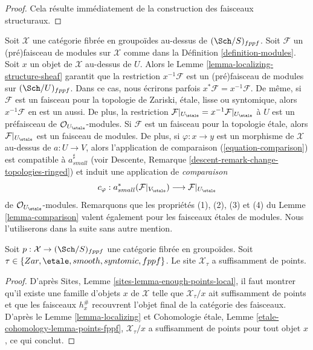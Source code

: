 \begin{proof}
Cela résulte immédiatement de la construction des faisceaux structuraux.
\end{proof}

\noindent
Soit $\mathcal{X}$ une catégorie fibrée en groupoïdes au-dessus de $(\Sch/S)_{fppf}$.
Soit $\mathcal{F}$ un (pré)faisceau de modules sur $\mathcal{X}$ comme dans la
Définition \ref{definition-modules}.
Soit $x$ un objet de $\mathcal{X}$ au-dessus de $U$. Alors le
Lemme \ref{lemma-localizing-structure-sheaf}
garantit que la restriction
$x^{-1}\mathcal{F}$ est un (pré)faisceau de modules sur $(\Sch/U)_{fppf}$.
Dans ce cas, nous écrirons parfois $x^*\mathcal{F} = x^{-1}\mathcal{F}$.
De même, si $\mathcal{F}$ est un faisceau pour la topologie de Zariski, étale, lisse
ou syntomique, alors $x^{-1}\mathcal{F}$ en est un aussi. De plus, la
restriction
$\mathcal{F}|_{U_\etale} = x^{-1}\mathcal{F}|_{U_\etale}$
à $U$ est un préfaisceau de $\mathcal{O}_{U_\etale}$-modules.
Si $\mathcal{F}$ est un faisceau pour la topologie étale, alors
$\mathcal{F}|_{U_\etale}$ est un faisceau de modules. De plus,
si $\varphi : x \to y$ est un morphisme de $\mathcal{X}$ au-dessus de
$a : U \to V$, alors l'application de comparaison (\ref{equation-comparison})
est compatible à $a_{small}^\sharp$ (voir
Descente, Remarque \ref{descent-remark-change-topologies-ringed})
et induit une application de {\it comparaison}
\begin{equation}
\label{equation-comparison-modules}
c_\varphi : a_{small}^*(\mathcal{F}|_{V_\etale})
\longrightarrow
\mathcal{F}|_{U_\etale}
\end{equation}
de $\mathcal{O}_{U_\etale}$-modules.
Remarquons que les propriétés (1), (2), (3) et (4) du
Lemme \ref{lemma-comparison}
valent également pour les faisceaux étales de modules.
Nous l'utiliserons dans la suite sans autre mention.

\begin{lemma}
\label{lemma-enough-points}
Soit $p : \mathcal{X} \to (\Sch/S)_{fppf}$ une catégorie fibrée
en groupoïdes. Soit $\tau \in \{Zar, \etale, smooth, syntomic, fppf\}$.
Le site $\mathcal{X}_\tau$ a suffisamment de points.
\end{lemma}

\begin{proof}
D'après
Sites, Lemme \ref{sites-lemma-enough-points-local},
il faut montrer qu'il existe une famille d'objets $x$ de $\mathcal{X}$
telle que $\mathcal{X}_\tau/x$ ait suffisamment de points et que les faisceaux
$h_x^\#$ recouvrent l'objet final de la catégorie des faisceaux.
D'après le
Lemme \ref{lemma-localizing}
et
Cohomologie étale, Lemme \ref{etale-cohomology-lemma-points-fppf},
$\mathcal{X}_\tau/x$ a suffisamment de points pour tout objet
$x$, ce qui conclut.
\end{proof}







